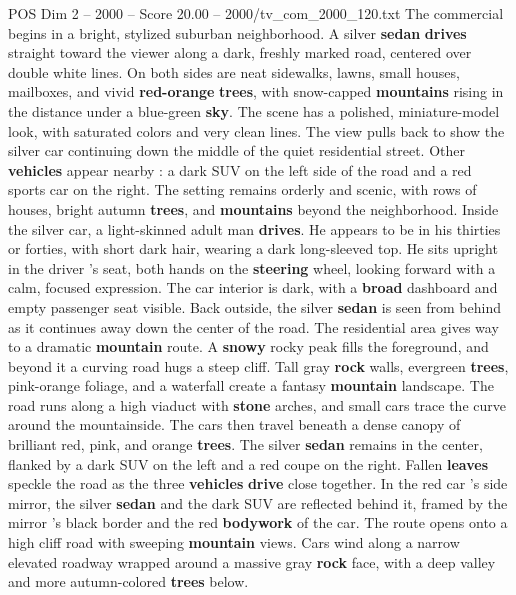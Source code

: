 \begin{textsample}{POS Dim 2 – 2000 – Score 20.00 – 2000/tv\_com\_2000\_120.txt}  \label{ex:f2_pos_027}
The commercial begins in a bright, stylized suburban neighborhood.
A silver \textbf{sedan} \textbf{drives} straight toward the viewer along a dark, freshly marked road, centered over double white lines.
On both sides are neat sidewalks, lawns, small houses, mailboxes, and vivid \textbf{red-orange} \textbf{trees}, with snow-capped \textbf{mountains} rising in the distance under a blue-green \textbf{sky}.
The scene has a polished, miniature-model look, with saturated colors and very clean lines.
The view pulls back to show the silver car continuing down the middle of the quiet residential street.
Other \textbf{vehicles} appear nearby : a dark SUV on the left side of the road and a red sports car on the right.
The setting remains orderly and scenic, with rows of houses, bright autumn \textbf{trees}, and \textbf{mountains} beyond the neighborhood.
Inside the silver car, a light-skinned adult man \textbf{drives}.
He appears to be in his thirties or forties, with short dark hair, wearing a dark long-sleeved top.
He sits upright in the driver ’s seat, both hands on the \textbf{steering} wheel, looking forward with a calm, focused expression.
The car interior is dark, with a \textbf{broad} dashboard and empty passenger seat visible.
Back outside, the silver \textbf{sedan} is seen from behind as it continues away down the center of the road.
The residential area gives way to a dramatic \textbf{mountain} route.
A \textbf{snowy} rocky peak fills the foreground, and beyond it a curving road hugs a steep cliff.
Tall gray \textbf{rock} walls, evergreen \textbf{trees}, pink-orange foliage, and a waterfall create a fantasy \textbf{mountain} landscape.
The road runs along a high viaduct with \textbf{stone} arches, and small cars trace the curve around the mountainside.
The cars then travel beneath a dense canopy of brilliant red, pink, and orange \textbf{trees}.
The silver \textbf{sedan} remains in the center, flanked by a dark SUV on the left and a red coupe on the right.
Fallen \textbf{leaves} speckle the road as the three \textbf{vehicles} \textbf{drive} close together.
In the red car ’s side mirror, the silver \textbf{sedan} and the dark SUV are reflected behind it, framed by the mirror ’s black border and the red \textbf{bodywork} of the car.
The route opens onto a high cliff road with sweeping \textbf{mountain} views.
Cars wind along a narrow elevated roadway wrapped around a massive gray \textbf{rock} face, with a deep valley and more autumn-colored \textbf{trees} below.

\end{textsample}
